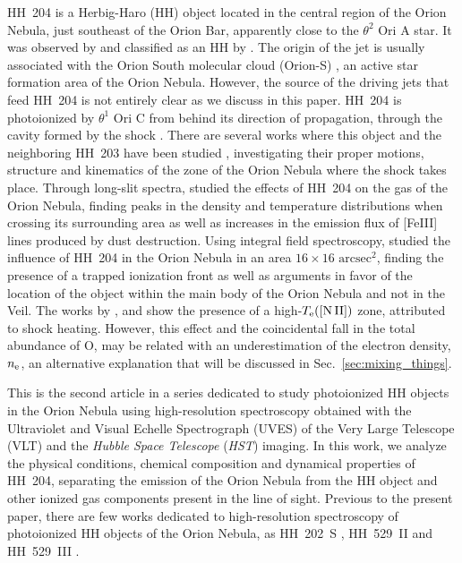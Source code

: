 \documentclass[twocolumn]{aastex63}
\begin{document}
HH~204 is a Herbig-Haro (HH) object located in the central region of the Orion Nebula, just southeast of the Orion Bar, apparently close to the $\theta^{2} \text{ Ori A}$ star. It was observed by \citet{munch62} and classified as an HH by \citet{Canto80}. The origin of the jet is usually associated with the Orion South molecular cloud (Orion-S) \citep{odell17}, an active star formation area of the Orion Nebula. However, the source of the driving jets that feed HH~204 is not entirely clear as we discuss in this paper. HH~204 is photoionized by $\theta^{1} \text{ Ori C}$ from behind its direction of propagation, through the cavity formed by the shock \citep{odell97,odell17}. There are several works where this object and the  neighboring HH~203 have been studied \citep[and references therein]{Doi:2004a, Henney07, Garcia-Diaz:2008a, ODell:2015a}, investigating their proper motions, structure and kinematics of the zone of the Orion Nebula where the shock takes place. Through long-slit spectra, \citet{mesadelgado08} studied the effects of HH~204 on the gas of the Orion Nebula, finding peaks in the density and temperature distributions when crossing its surrounding area as well as increases in the emission flux of [Fe\thinspace III] lines produced by dust destruction. Using integral field spectroscopy,  \citet{nunezdiaz12} studied the influence of HH~204 in the Orion Nebula in an area $16\times 16 \text{ arcsec}^2$, finding the presence of a trapped ionization front as well as arguments in favor of the location of the object within the main body of the Orion Nebula and not in the Veil. The works by \citet{mesadelgado08}, \citet{nunezdiaz12} and \citet{odell17} show the presence of a high-$T_{\rm e}(\text{[N\thinspace II]})$ zone, attributed to shock heating. However, this effect and the coincidental fall in the total abundance of O, may be related with an underestimation of the electron density, $n_{\rm e}$, an alternative explanation that will be discussed in Sec.~\ref{sec:mixing_things}. 

This is the second article in a series dedicated to study photoionized HH objects in the Orion Nebula using high-resolution spectroscopy obtained with the  Ultraviolet and Visual Echelle Spectrograph (UVES) \citep{Dodorico00} of the Very Large Telescope (VLT) and the \textit{Hubble Space Telescope} (\textit{HST}) imaging. In this work, we analyze the physical conditions, chemical composition and dynamical properties of HH~204, separating the emission of the Orion Nebula from the HH object and other ionized gas components present in the line of sight. Previous to the present paper, there are few works dedicated to high-resolution spectroscopy of photoionized HH objects of the Orion Nebula, as HH~202~S \citep{mesadelgado09}, HH~529~II and HH~529~III \citep{Blagrave06, mendez2021}. 
\end{document}
